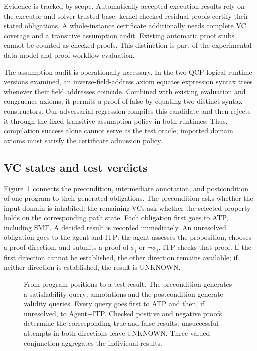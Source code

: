 Evidence is tracked by scope. Automatically accepted execution results rely on
the executor and solver trusted base; kernel-checked residual proofs certify
their stated obligations. A whole-instance certificate additionally needs
complete VC coverage and a transitive assumption audit. Existing automatic
proof stubs cannot be counted as checked proofs. This distinction is part of
the experimental data model and proof-workflow evaluation.

The assumption audit is operationally necessary. In the two QCP logical
runtime versions examined, an inverse-field-address axiom equates expression
syntax trees whenever their field addresses coincide. Combined with existing
evaluation and congruence axioms, it permits a proof of false by equating two
distinct syntax constructors. Our adversarial regression compiles this
candidate and then rejects it through the fixed transitive-assumption policy
in both runtimes. Thus, compilation success alone cannot serve as the test
oracle; imported domain axioms must satisfy the certificate admission policy.

\subsection{VC states and test verdicts}

Figure~\ref{fig:result-flow} connects the precondition, intermediate
annotation, and postcondition of one program to their generated obligations.
The precondition asks whether the input domain is inhabited; the remaining
VCs ask whether the selected property holds on the corresponding path state.
Each obligation first goes to ATP, including SMT. A decided result is recorded
immediately. An unresolved obligation goes to the agent and ITP: the agent
assesses the proposition, chooses a proof direction, and submits a proof of
$\phi_i$ or $\neg\phi_i$. ITP checks that proof. If the first direction cannot
be established, the other direction remains available; if neither direction
is established, the result is UNKNOWN.

\begin{figure}[t]
  \centering
  \resizebox{\textwidth}{!}{}
  \caption{From program positions to a test result. The precondition generates
  a satisfiability query; annotations and the postcondition generate validity
  queries. Every query goes first to ATP and then, if unresolved, to Agent+ITP.
  Checked positive and negative proofs determine the corresponding true and
  false results; unsuccessful attempts in both directions leave UNKNOWN.
  Three-valued conjunction aggregates the individual results.}
  \label{fig:result-flow}
\end{figure}


